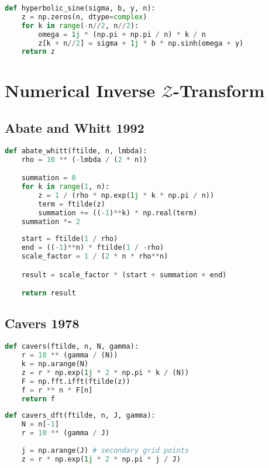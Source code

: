 \begin{appendices}
\begin{lstlisting}[language=Python, caption= null]
def hyperbolic_sine(sigma, b, y, n):
    z = np.zeros(n, dtype=complex)
    for k in range(-n//2, n//2):
        omega = 1j * (np.pi + np.pi / n) * k / n
        z[k + n//2] = sigma + 1j * b * np.sinh(omega + y)
    return z
\end{lstlisting}

\newpage
\section{Numerical Inverse $\mathcal{Z}$-Transform}

\subsection{Abate and Whitt 1992}
\begin{lstlisting}[language=Python, caption= null ]
def abate_whitt(ftilde, n, lmbda):
    rho = 10 ** (-lmbda / (2 * n))

    summation = 0
    for k in range(1, n):
        z = 1 / (rho * np.exp(1j * k * np.pi / n))
        term = ftilde(z)
        summation += ((-1)**k) * np.real(term)
    summation *= 2
    
    start = ftilde(1 / rho)
    end = ((-1)**n) * ftilde(1 / -rho)
    scale_factor = 1 / (2 * n * rho**n)

    result = scale_factor * (start + summation + end)

    return result
\end{lstlisting}

\subsection{Cavers 1978}
\begin{lstlisting}[language=Python, caption= null]
def cavers(ftilde, n, N, gamma):
    r = 10 ** (gamma / (N))
    k = np.arange(N)
    z = r * np.exp(1j * 2 * np.pi * k / (N))
    F = np.fft.ifft(ftilde(z))
    f = r ** n * F[n]
    return f
\end{lstlisting}

\begin{lstlisting}[language=Python, caption= null]
def cavers_dft(ftilde, n, J, gamma):
    N = n[-1]
    r = 10 ** (gamma / J)
    
    j = np.arange(J) # secondary grid points
    z = r * np.exp(1j * 2 * np.pi * j / J)
    

\end{lstlisting}
\end{appendices}
